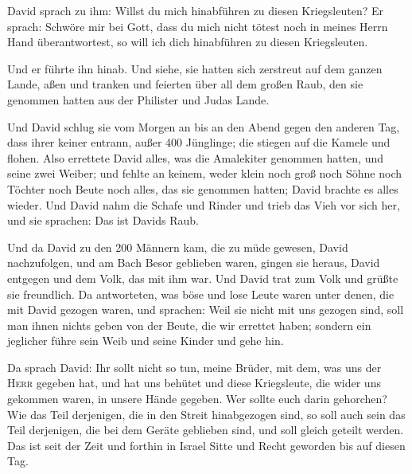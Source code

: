  David sprach zu ihm: Willst du mich hinabführen zu
diesen Kriegsleuten? Er sprach: Schwöre mir bei Gott, dass du mich nicht
tötest noch in meines Herrn Hand überantwortest, so will ich dich
hinabführen zu diesen Kriegsleuten.

 Und er führte ihn hinab. Und siehe, sie hatten sich
zerstreut auf dem ganzen Lande, aßen und tranken und feierten über all
dem großen Raub, den sie genommen hatten aus der Philister und Judas
Lande.

 Und David schlug sie vom Morgen an bis an den Abend
gegen den anderen Tag, dass ihrer keiner entrann, außer 400 Jünglinge;
die stiegen auf die Kamele und flohen.  Also errettete
David alles, was die Amalekiter genommen hatten, und seine zwei Weiber;
 und fehlte an keinem, weder klein noch groß noch Söhne
noch Töchter noch Beute noch alles, das sie genommen hatten; David
brachte es alles wieder.  Und David nahm die Schafe und
Rinder und trieb das Vieh vor sich her, und sie sprachen: Das ist Davids
Raub.

 Und da David zu den 200 Männern kam, die zu müde
gewesen, David nachzufolgen, und am Bach Besor geblieben waren, gingen
sie heraus, David entgegen und dem Volk, das mit ihm war. Und David trat
zum Volk und grüßte sie freundlich.  Da antworteten, was
böse und lose Leute waren unter denen, die mit David gezogen waren, und
sprachen: Weil sie nicht mit uns gezogen sind, soll man ihnen nichts
geben von der Beute, die wir errettet haben; sondern ein jeglicher führe
sein Weib und seine Kinder und gehe hin.

 Da sprach David: Ihr sollt nicht so tun, meine Brüder,
mit dem, was uns der \textsc{Herr} gegeben hat, und hat uns behütet und
diese Kriegsleute, die wider uns gekommen waren, in unsere Hände
gegeben.  Wer sollte euch darin gehorchen? Wie das Teil
derjenigen, die in den Streit hinabgezogen sind, so soll auch sein das
Teil derjenigen, die bei dem Geräte geblieben sind, und soll gleich
geteilt werden.  Das ist seit der Zeit und forthin in
Israel Sitte und Recht geworden bis auf diesen Tag.

